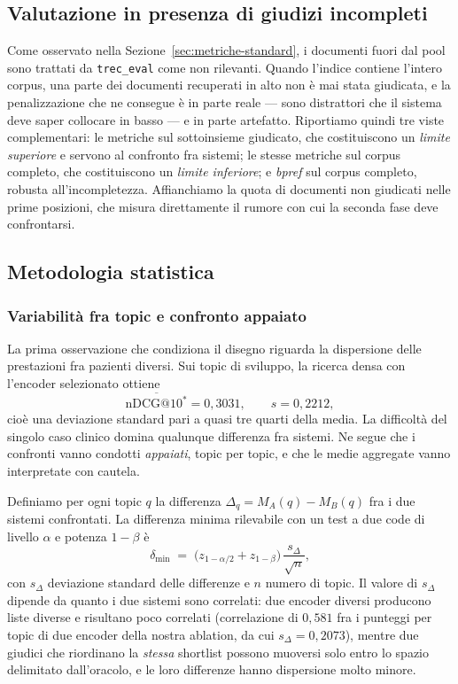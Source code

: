 \documentclass[pdflatex,sn-mathphys-num]{sn-jnl}
\theoremstyle{thmstyleone}
\theoremstyle{thmstyletwo}
\theoremstyle{thmstylethree}
\begin{document}
\subsection{Valutazione in presenza di giudizi incompleti}\label{sec:incompleti}

Come osservato nella Sezione~\ref{sec:metriche-standard}, i documenti fuori dal pool sono trattati da \texttt{trec\_eval} come non rilevanti. Quando l'indice contiene l'intero corpus, una parte dei documenti recuperati in alto non è mai stata giudicata, e la penalizzazione che ne consegue è in parte reale --- sono distrattori che il sistema deve saper collocare in basso --- e in parte artefatto. Riportiamo quindi tre viste complementari: le metriche sul sottoinsieme giudicato, che costituiscono un \emph{limite superiore} e servono al confronto fra sistemi; le stesse metriche sul corpus completo, che costituiscono un \emph{limite inferiore}; e \emph{bpref} sul corpus completo, robusta all'incompletezza. Affianchiamo la quota di documenti non giudicati nelle prime posizioni, che misura direttamente il rumore con cui la seconda fase deve confrontarsi.

\subsection{Metodologia statistica}\label{sec:statistica}

\subsubsection{Variabilità fra topic e confronto appaiato}\label{sec:varianza}

La prima osservazione che condiziona il disegno riguarda la dispersione delle prestazioni fra pazienti diversi. Sui topic di sviluppo, la ricerca densa con l'encoder selezionato ottiene
\begin{equation*}
  \overline{\mathrm{nDCG@}10^{*}} = 0{,}3031, \qquad s = 0{,}2212,
\end{equation*}
cioè una deviazione standard pari a quasi tre quarti della media. La difficoltà del singolo caso clinico domina qualunque differenza fra sistemi. Ne segue che i confronti vanno condotti \emph{appaiati}, topic per topic, e che le medie aggregate vanno interpretate con cautela.

Definiamo per ogni topic $q$ la differenza $\Delta_q = M_A(q) - M_B(q)$ fra i due sistemi confrontati. La differenza minima rilevabile con un test a due code di livello $\alpha$ e potenza $1-\beta$ è
\begin{equation}
  \delta_{\min} \;=\; \big(z_{1-\alpha/2} + z_{1-\beta}\big)\,\frac{s_{\Delta}}{\sqrt{n}},
  \label{eq:mdd}
\end{equation}
con $s_{\Delta}$ deviazione standard delle differenze e $n$ numero di topic. Il valore di $s_{\Delta}$ dipende da quanto i due sistemi sono correlati: due encoder diversi producono liste diverse e risultano poco correlati (correlazione di $0{,}581$ fra i punteggi per topic di due encoder della nostra ablation, da cui $s_{\Delta} = 0{,}2073$), mentre due giudici che riordinano la \emph{stessa} shortlist possono muoversi solo entro lo spazio delimitato dall'oracolo, e le loro differenze hanno dispersione molto minore.
\end{document}
